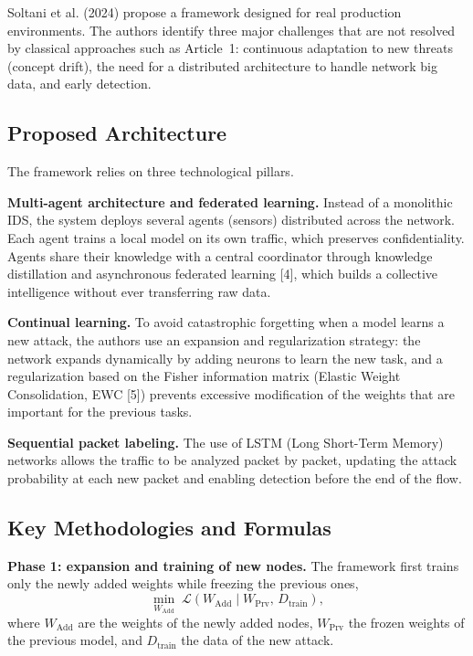\documentclass[11pt,a4paper]{article}
\begin{document}
Soltani et al. (2024) propose a framework designed for real production environments. The authors identify three major challenges that are not resolved by classical approaches such as Article~1: continuous adaptation to new threats (concept drift), the need for a distributed architecture to handle network big data, and early detection.

\subsection{Proposed Architecture}

The framework relies on three technological pillars.

\textbf{Multi-agent architecture and federated learning.} Instead of a monolithic IDS, the system deploys several agents (sensors) distributed across the network. Each agent trains a local model on its own traffic, which preserves confidentiality. Agents share their knowledge with a central coordinator through knowledge distillation and asynchronous federated learning [4], which builds a collective intelligence without ever transferring raw data.

\textbf{Continual learning.} To avoid catastrophic forgetting when a model learns a new attack, the authors use an expansion and regularization strategy: the network expands dynamically by adding neurons to learn the new task, and a regularization based on the Fisher information matrix (Elastic Weight Consolidation, EWC [5]) prevents excessive modification of the weights that are important for the previous tasks.

\textbf{Sequential packet labeling.} The use of LSTM (Long Short-Term Memory) networks allows the traffic to be analyzed packet by packet, updating the attack probability at each new packet and enabling detection before the end of the flow.

\subsection{Key Methodologies and Formulas}

\textbf{Phase 1: expansion and training of new nodes.} The framework first trains only the newly added weights while freezing the previous ones,
\begin{equation}
\min_{W_{\mathrm{Add}}} \; \mathcal{L}\!\left(W_{\mathrm{Add}} \mid W_{\mathrm{Prv}},\, D_{\mathrm{train}}\right),
\end{equation}
where $W_{\mathrm{Add}}$ are the weights of the newly added nodes, $W_{\mathrm{Prv}}$ the frozen weights of the previous model, and $D_{\mathrm{train}}$ the data of the new attack.
\end{document}
